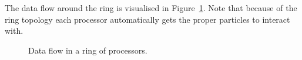 The data flow around the ring is visualised in Figure~\ref{Fig:ring}. 
Note that because of the ring topology each processor automatically 
gets the proper particles to interact with.
\begin {figure}
\centerline{}
\caption {Data flow in a ring of processors.}
\label{Fig:ring}
\end {figure}




